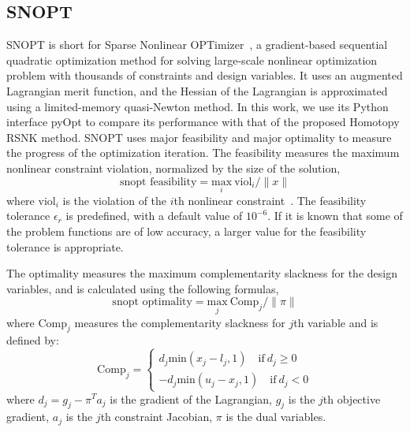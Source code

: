\subsection{SNOPT}
SNOPT is short for Sparse Nonlinear OPTimizer~\cite{gill:2002}, a gradient-based sequential 
quadratic optimization method for solving large-scale nonlinear optimization problem 
with thousands of constraints and design variables. It uses an augmented Lagrangian 
merit function, and the Hessian of the Lagrangian is approximated
using a limited-memory quasi-Newton method. In this work, we use its Python interface 
pyOpt to compare its performance with that of the proposed Homotopy RSNK method. 
SNOPT uses major feasibility and major optimality to measure the progress of the 
optimization iteration. The feasibility measures the maximum nonlinear constraint violation, 
normalized by the size of the solution,
\begin{equation*}
\text{snopt feasibility} = \underset{i}{\text{max}}  \ \text{viol}_i / \lVert x \rVert 
\end{equation*}
where $\text{viol}_i$ is the violation of the $i$th nonlinear constraint~\cite{snopt_manual}. The feasibility tolerance 
$\epsilon_r$ is predefined, with a default value of $10^{-6}$. If it is known that some of the problem 
functions are of low accuracy, a larger value for the feasibility tolerance is appropriate. 

The optimality measures the maximum complementarity slackness for the design variables, 
and is calculated using the following formulas, 
\begin{equation*}
\text{snopt optimality} = \underset{j}{\text{max}}  \ \text{Comp}_j / \lVert \pi \rVert 
\end{equation*}
where $\text{Comp}_j$ measures the complementarity slackness for $j$th variable and is defined by:
\begin{equation*}
\text{Comp}_j = \begin{cases}
d_j \text{min} (x_j - l_j, 1)  \quad \text{if} \ d_j \geq 0 \\
-d_j \text{min} (u_j - x_j, 1) \quad \text{if} \ d_j < 0
\end{cases}
\end{equation*}
where $d_j = g_j - \pi^T a_j$ is the gradient of the Lagrangian, $g_j$ is the $j$th objective gradient, 
$a_j$ is the $j$th constraint Jacobian, $\pi$ is the dual variables. 

